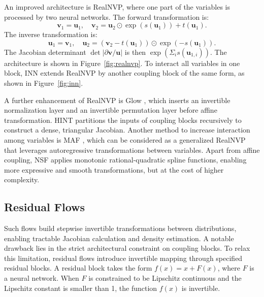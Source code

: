 An improved architecture is \ac{RealNVP}, where one part of the variables is processed by two neural networks. The forward transformation is:
\begin{equation}
    \boldsymbol{v}_1 = \boldsymbol{u}_1, \quad \boldsymbol{v}_2 = \boldsymbol{u}_2\odot\exp(s(\boldsymbol{u}_1))+t(\boldsymbol{u}_1).
\end{equation}
The inverse transformation is:
\begin{equation}
    \boldsymbol{u}_1 = \boldsymbol{v}_1, \quad \boldsymbol{u}_2 = (\boldsymbol{v}_2-t(\boldsymbol{u}_1))\odot\exp(-s(\boldsymbol{u}_1)).
\end{equation}
The Jacobian determinant $\det|\partial\boldsymbol{v}/\boldsymbol{u}|$ is then $\exp(\Sigma_i s(\boldsymbol{u}_{1,i}))$.
The architecture is shown in Figure~\ref{fig:realnvp}. To interact all variables in one block, \ac{INN} \citep{ardizzone2019inn} extends \ac{RealNVP} by another coupling block of the same form, as shown in Figure~\ref{fig:inn}. 

A further enhancement of \ac{RealNVP} is Glow \citep{kingma2018glow}, which inserts an invertible normalization layer and an invertible permutation layer before affine transformation. \ac{HINT} \citep{kruse2021hint} partitions the inputs of coupling blocks recursively to construct a dense, triangular Jacobian. Another method to increase interaction among variables is \ac{MAF} \citep{papamakarios2018maf}, which can be considered as a generalized \ac{RealNVP} that leverages autoregressive transformations between variables. Apart from affine coupling, \ac{NSF} \citep{durkan2019neuralsplineflows} applies monotonic rational-quadratic spline functions, enabling more expressive and smooth transformations, but at the cost of higher complexity. 

\subsection{Residual Flows}\label{sec:resflow}
Such flows build stepwise invertible transformations between distributions, enabling tractable Jacobian calculation and density estimation. A notable drawback lies in the strict architectural constraint on coupling blocks. To relax this limitation, residual flows \citep{behrmann2019ires, chen2020resflow} introduce invertible mapping through specified residual blocks. A residual block \citep{he2015residual} takes the form $f(x)=x+F(x)$, where $F$ is a neural network. When $F$ is constrained to be Lipschitz continuous and the Lipschitz constant is smaller than 1, the function $f(x)$ is invertible. 

